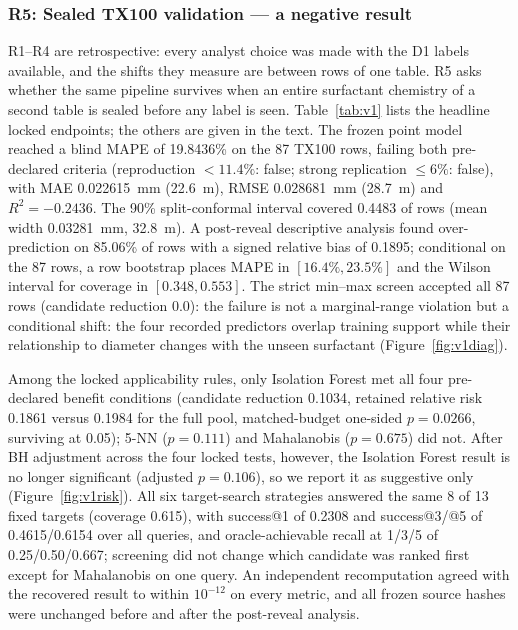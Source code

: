 \documentclass[11pt,a4paper]{article}
\newcommand{\um}{\textmu m}
\newcommand{\tox}{TX100}
\begin{document}
\subsubsection{R5: Sealed \tox{} validation --- a negative result}
\label{sec:r5}
R1--R4 are retrospective: every analyst choice was made with the D1 labels
available, and the shifts they measure are between rows of one table. R5 asks
whether the same pipeline survives when an entire surfactant chemistry of a
second table is sealed before any label is seen. Table~\ref{tab:v1} lists the headline locked endpoints; the others are given in the text. The frozen point model reached
a blind MAPE of 19.8436\% on the 87 \tox{} rows, failing both pre-declared
criteria (reproduction $<11.4\%$: false; strong replication $\le 6\%$: false),
with MAE 0.022615~mm (22.6~\um), RMSE 0.028681~mm (28.7~\um) and
$R^2=-0.2436$. The 90\% split-conformal interval covered 0.4483 of rows
(mean width 0.03281~mm, 32.8~\um). A
post-reveal descriptive analysis found over-prediction on 85.06\% of rows with
a signed relative bias of 0.1895; conditional on the 87 rows, a row bootstrap
places MAPE in $[16.4\%, 23.5\%]$ and the Wilson interval for coverage in
$[0.348, 0.553]$. The strict min--max screen accepted all 87 rows
(candidate reduction 0.0): the failure is not a marginal-range violation but
a conditional shift: the four recorded predictors overlap training support
while their relationship to diameter changes with the unseen surfactant
(Figure~\ref{fig:v1diag}).

Among the locked applicability rules, only Isolation Forest met all four
pre-declared benefit conditions (candidate reduction 0.1034, retained relative
risk 0.1861 versus 0.1984 for the full pool, matched-budget one-sided
$p=0.0266$, surviving at 0.05); 5-NN ($p=0.111$) and Mahalanobis ($p=0.675$)
did not. After BH adjustment across the four locked tests, however, the
Isolation Forest result is no longer significant (adjusted $p=0.106$), so we
report it as suggestive only (Figure~\ref{fig:v1risk}). All six target-search
strategies answered the same 8 of 13 fixed targets (coverage 0.615), with
success@1 of 0.2308 and success@3/@5 of 0.4615/0.6154 over all queries, and
oracle-achievable recall at 1/3/5 of 0.25/0.50/0.667; screening did not change
which candidate was ranked first except for Mahalanobis on one query. An
independent recomputation agreed with the recovered result to within
$10^{-12}$ on every metric, and all frozen source hashes were unchanged before
and after the post-reveal analysis.
\end{document}
